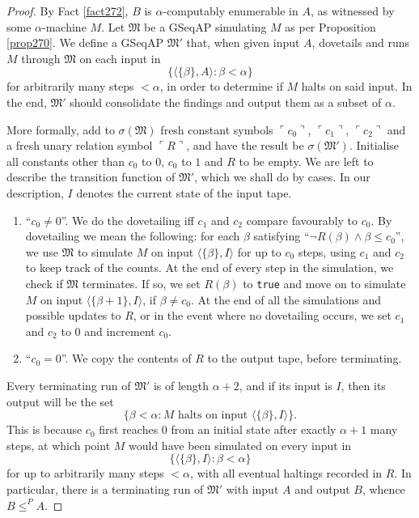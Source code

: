 \documentclass[12pt, twoside]{memoir}
\numberwithin{equation}{section}
\theoremstyle{definition}
\theoremstyle{remark}
\theoremstyle{definition}
\theoremstyle{definition}
\theoremstyle{definition}
\theoremstyle{remark}
\begin{document}
\begin{proof}
By Fact \ref{fact272}, $B$ is $\alpha$-computably enumerable in $A$, as witnessed by some $\alpha$-machine $M$. Let $\mathfrak{M}$ be a GSeqAP simulating $M$ as per Proposition \ref{prop270}. We define a GSeqAP $\mathfrak{M}'$ that, when given input $A$, dovetails and runs $M$ through $\mathfrak{M}$ on each input in
\begin{equation*}
    \{\langle \{\beta\}, A \rangle : \beta < \alpha\}
\end{equation*}
for arbitrarily many steps $< \alpha$, in order to determine if $M$ halts on said input. In the end, $\mathfrak{M}'$ should consolidate the findings and output them as a subset of $\alpha$.

More formally, add to $\sigma(\mathfrak{M})$ fresh constant symbols $\ulcorner c_0 \urcorner$, $\ulcorner c_1 \urcorner$, $\ulcorner c_2 \urcorner$ and a fresh unary relation symbol $\ulcorner R \urcorner$, and have the result be $\sigma(\mathfrak{M}')$. Initialise all constants other than $c_0$ to $0$, $c_0$ to $1$ and $R$ to be empty. We are left to describe the transition function of $\mathfrak{M}'$, which we shall do by cases. In our description, $I$ denotes the current state of the input tape.
\begin{enumerate}[leftmargin=60pt, label=Case \arabic*:]
    \item ``$c_0 \neq 0$''. We do the dovetailing iff $c_1$ and $c_2$ compare favourably to $c_0$. By dovetailing we mean the following: for each $\beta$ satisfying ``$\neg R(\beta) \wedge \beta \leq c_0$'', we use $\mathfrak{M}$ to simulate $M$ on input $\langle \{\beta\}, I \rangle$ for up to $c_0$ steps, using $c_1$ and $c_2$ to keep track of the counts. At the end of every step in the simulation, we check if $\mathfrak{M}$ terminates. If so, we set $R(\beta)$ to \texttt{true} and move on to simulate $M$ on input $\langle \{\beta + 1\}, I \rangle$, if $\beta \neq c_0$. At the end of all the simulations and possible updates to $R$, or in the event where no dovetailing occurs, we set $c_1$ and $c_2$ to $0$ and increment $c_0$. 
    \item\label{8340c3} ``$c_0 = 0$''. We copy the contents of $R$ to the output tape, before terminating.
\end{enumerate}
Every terminating run of $\mathfrak{M}'$ is of length $\alpha + 2$, and if its input is $I$, then its output will be the set
\begin{equation*}
    \{\beta < \alpha : M \text{ halts on input } \langle \{\beta\}, I \rangle\} \text{.}
\end{equation*}
This is because $c_0$ first reaches $0$ from an initial state after exactly $\alpha + 1$ many steps, at which point $M$ would have been simulated on every input in 
\begin{equation*}
    \{\langle \{\beta\}, I \rangle : \beta < \alpha\}
\end{equation*}
for up to arbitrarily many steps $< \alpha$, with all eventual haltings recorded in $R$. In particular, there is a terminating run of $\mathfrak{M}'$ with input $A$ and output $B$, whence $B \leq^P A$.
\end{proof}
\end{document}

